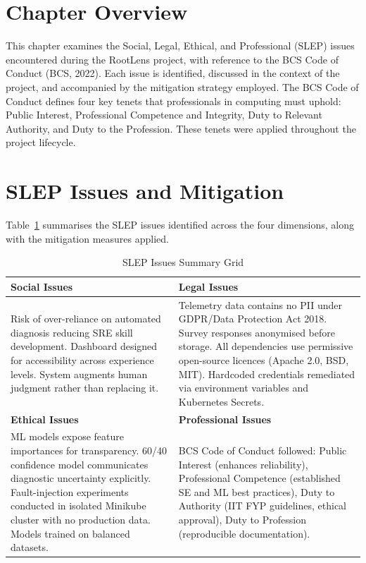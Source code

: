 
\section{Chapter Overview}
This chapter examines the Social, Legal, Ethical, and Professional (SLEP) issues encountered during the RootLens project, with reference to the BCS Code of Conduct (BCS, 2022). Each issue is identified, discussed in the context of the project, and accompanied by the mitigation strategy employed. The BCS Code of Conduct defines four key tenets that professionals in computing must uphold: Public Interest, Professional Competence and Integrity, Duty to Relevant Authority, and Duty to the Profession. These tenets were applied throughout the project lifecycle.

\section{SLEP Issues and Mitigation}

Table~\ref{tab:slep_issues} summarises the SLEP issues identified across the four dimensions, along with the mitigation measures applied.

\begin{table}[H]
\centering
\renewcommand{\arraystretch}{1.4}
\begin{tabularx}{\textwidth}{|X|X|}
\hline
\textbf{Social Issues} & \textbf{Legal Issues} \\ \hline
Risk of over-reliance on automated diagnosis reducing SRE skill development. Dashboard designed for accessibility across experience levels. System augments human judgment rather than replacing it. &
Telemetry data contains no PII under GDPR/Data Protection Act 2018. Survey responses anonymised before storage. All dependencies use permissive open-source licences (Apache 2.0, BSD, MIT). Hardcoded credentials remediated via environment variables and Kubernetes Secrets. \\ \hline
\textbf{Ethical Issues} & \textbf{Professional Issues} \\ \hline
ML models expose feature importances for transparency. 60/40 confidence model communicates diagnostic uncertainty explicitly. Fault-injection experiments conducted in isolated Minikube cluster with no production data. Models trained on balanced datasets. &
BCS Code of Conduct followed: Public Interest (enhances reliability), Professional Competence (established SE and ML best practices), Duty to Authority (IIT FYP guidelines, ethical approval), Duty to Profession (reproducible documentation). \\ \hline
\end{tabularx}
\caption{SLEP Issues Summary Grid}
\label{tab:slep_issues}
\end{table}

